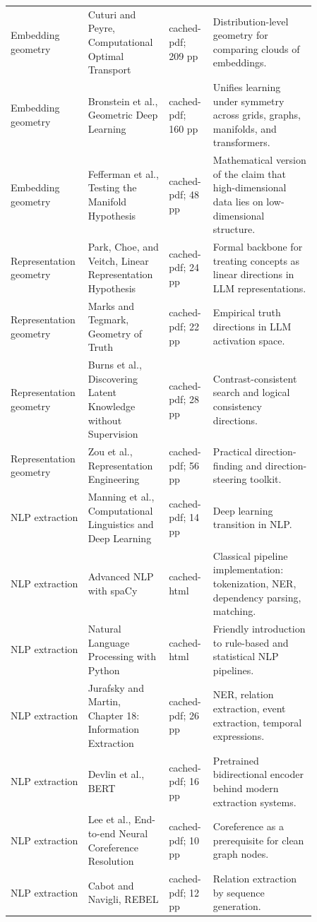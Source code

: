 \documentclass[11pt]{article}
\begin{document}
\begin{longtable}{p{0.16\linewidth}p{0.25\linewidth}p{0.13\linewidth}p{0.32\linewidth}}
Embedding geometry & Cuturi and Peyre, Computational Optimal Transport & cached-pdf; 209 pp & Distribution-level geometry for comparing clouds of embeddings. \\
Embedding geometry & Bronstein et al., Geometric Deep Learning & cached-pdf; 160 pp & Unifies learning under symmetry across grids, graphs, manifolds, and transformers. \\
Embedding geometry & Fefferman et al., Testing the Manifold Hypothesis & cached-pdf; 48 pp & Mathematical version of the claim that high-dimensional data lies on low-dimensional structure. \\
Representation geometry & Park, Choe, and Veitch, Linear Representation Hypothesis & cached-pdf; 24 pp & Formal backbone for treating concepts as linear directions in LLM representations. \\
Representation geometry & Marks and Tegmark, Geometry of Truth & cached-pdf; 22 pp & Empirical truth directions in LLM activation space. \\
Representation geometry & Burns et al., Discovering Latent Knowledge without Supervision & cached-pdf; 28 pp & Contrast-consistent search and logical consistency directions. \\
Representation geometry & Zou et al., Representation Engineering & cached-pdf; 56 pp & Practical direction-finding and direction-steering toolkit. \\
NLP extraction & Manning et al., Computational Linguistics and Deep Learning & cached-pdf; 14 pp & Deep learning transition in NLP. \\
NLP extraction & Advanced NLP with spaCy & cached-html & Classical pipeline implementation: tokenization, NER, dependency parsing, matching. \\
NLP extraction & Natural Language Processing with Python & cached-html & Friendly introduction to rule-based and statistical NLP pipelines. \\
NLP extraction & Jurafsky and Martin, Chapter 18: Information Extraction & cached-pdf; 26 pp & NER, relation extraction, event extraction, temporal expressions. \\
NLP extraction & Devlin et al., BERT & cached-pdf; 16 pp & Pretrained bidirectional encoder behind modern extraction systems. \\
NLP extraction & Lee et al., End-to-end Neural Coreference Resolution & cached-pdf; 10 pp & Coreference as a prerequisite for clean graph nodes. \\
NLP extraction & Cabot and Navigli, REBEL & cached-pdf; 12 pp & Relation extraction by sequence generation. \\

\end{longtable}
\end{document}
